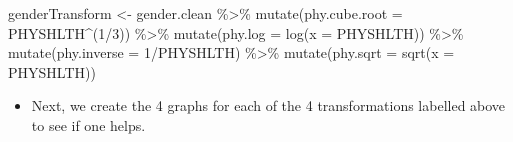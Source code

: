 \documentclass[
  letterpaper,
  DIV=11,
  numbers=noendperiod]{scrreprt}
\newenvironment{Shaded}{\begin{snugshade}}{\end{snugshade}}
\newcommand{\AttributeTok}[1]{\textcolor[rgb]{0.40,0.45,0.13}{#1}}
\newcommand{\DecValTok}[1]{\textcolor[rgb]{0.68,0.00,0.00}{#1}}
\newcommand{\FunctionTok}[1]{\textcolor[rgb]{0.28,0.35,0.67}{#1}}
\newcommand{\NormalTok}[1]{\textcolor[rgb]{0.00,0.23,0.31}{#1}}
\newcommand{\OtherTok}[1]{\textcolor[rgb]{0.00,0.23,0.31}{#1}}
\newcommand{\SpecialCharTok}[1]{\textcolor[rgb]{0.37,0.37,0.37}{#1}}
\providecommand{\tightlist}{%
  \setlength{\itemsep}{0pt}\setlength{\parskip}{0pt}}\usepackage{longtable,booktabs,array}
\begin{document}
\begin{Shaded}
\begin{Highlighting}[]
\NormalTok{genderTransform }\OtherTok{\textless{}{-}}\NormalTok{ gender.clean }\SpecialCharTok{\%\textgreater{}\%}
    \FunctionTok{mutate}\NormalTok{(}\AttributeTok{phy.cube.root =}\NormalTok{ PHYSHLTH}\SpecialCharTok{\^{}}\NormalTok{(}\DecValTok{1}\SpecialCharTok{/}\DecValTok{3}\NormalTok{)) }\SpecialCharTok{\%\textgreater{}\%}
    \FunctionTok{mutate}\NormalTok{(}\AttributeTok{phy.log =} \FunctionTok{log}\NormalTok{(}\AttributeTok{x =}\NormalTok{ PHYSHLTH)) }\SpecialCharTok{\%\textgreater{}\%}
    \FunctionTok{mutate}\NormalTok{(}\AttributeTok{phy.inverse =} \DecValTok{1}\SpecialCharTok{/}\NormalTok{PHYSHLTH) }\SpecialCharTok{\%\textgreater{}\%}
    \FunctionTok{mutate}\NormalTok{(}\AttributeTok{phy.sqrt =} \FunctionTok{sqrt}\NormalTok{(}\AttributeTok{x =}\NormalTok{ PHYSHLTH))}
\end{Highlighting}
\end{Shaded}

\begin{itemize}
\tightlist
\item
  Next, we create the 4 graphs for each of the 4 transformations
  labelled above to see if one helps.
\end{itemize}
\end{document}
